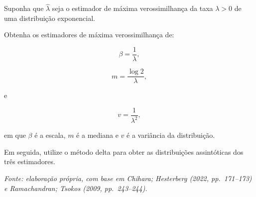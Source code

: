 \documentclass[
  letterpaper,
  DIV=11,
  numbers=noendperiod]{scrreprt}
\begin{document}
\begin{tcolorbox}[enhanced jigsaw, colback=white, leftrule=.75mm, colbacktitle=quarto-callout-tip-color!10!white, breakable, titlerule=0mm, bottomtitle=1mm, title=\textcolor{quarto-callout-tip-color}{\faLightbulb}\hspace{0.5em}{Exercício 8 --- Invariância}, colframe=quarto-callout-tip-color-frame, toprule=.15mm, opacityback=0, bottomrule=.15mm, opacitybacktitle=0.6, arc=.35mm, toptitle=1mm, rightrule=.15mm, coltitle=black, left=2mm]

Suponha que \(\widehat\lambda\) seja o estimador de máxima
verossimilhança da taxa \(\lambda>0\) de uma distribuição exponencial.

Obtenha os estimadores de máxima verossimilhança de:

\[\beta
=
\frac{1}{\lambda},\]

\[m
=
\frac{\log 2}{\lambda},\]

e

\[v
=
\frac{1}{\lambda^2},\]

em que \(\beta\) é a escala, \(m\) é a mediana e \(v\) é a variância da
distribuição.

Em seguida, utilize o método delta para obter as distribuições
assintóticas dos três estimadores.

\emph{Fonte: elaboração própria, com base em Chihara; Hesterberg (2022,
pp.~171--173) e Ramachandran; Tsokos (2009, pp.~243--244).}

\end{tcolorbox}
\end{document}
